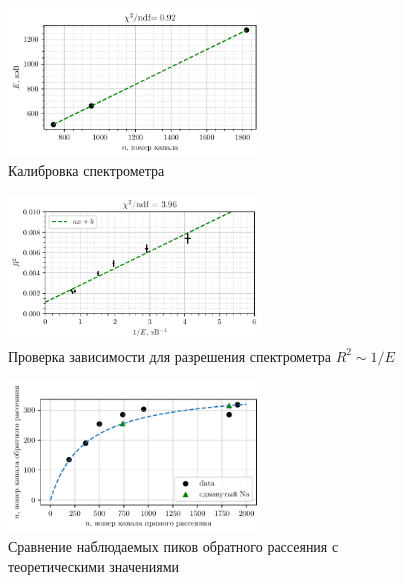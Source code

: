 \begin{figure}[h]
    \centering
    \includegraphics[width=0.6\textwidth]{figures/calibr.pdf}
    \caption{Калибровка спектрометра}
\end{figure}


\begin{figure}[h]
    \centering
    \includegraphics[width=0.6\textwidth]{figures/dpi.pdf}
    \caption{Проверка зависимости для разрешения спектрометра $R^2 \sim 1/E$}
\end{figure}

\begin{figure}[h]
    \centering
    \includegraphics[width=0.6\textwidth]{figures/back.pdf}
    \caption{Сравнение наблюдаемых пиков обратного рассеяния с теоретическими значениями}
\end{figure}
